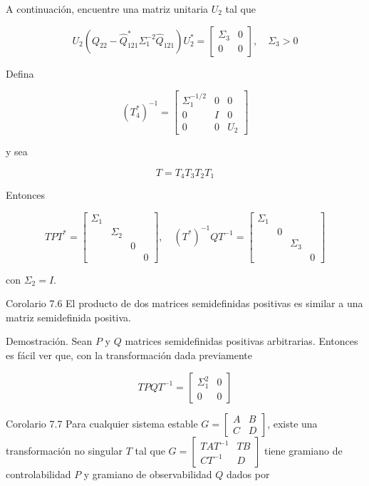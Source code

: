 A continuación, encuentre una matriz unitaria $U_{2}$ tal que

$$
U_{2}\left(Q_{22}-\hat{Q}_{121}^{*} \Sigma_{1}^{-2} \hat{Q}_{121}\right) U_{2}^{*}=\left[\begin{array}{cc}
\Sigma_{3} & 0 \\
0 & 0
\end{array}\right], \quad \Sigma_{3}>0
$$

Defina

$$
\left(T_{4}^{*}\right)^{-1}=\left[\begin{array}{ccc}
\Sigma_{1}^{-1 / 2} & 0 & 0 \\
0 & I & 0 \\
0 & 0 & U_{2}
\end{array}\right]
$$

y sea

$$
T=T_{4} T_{3} T_{2} T_{1}
$$

Entonces

$$
T P T^{*}=\left[\begin{array}{cccc}
\Sigma_{1} & & & \\
& \Sigma_{2} & & \\
& & 0 & \\
& & & 0
\end{array}\right], \quad\left(T^{*}\right)^{-1} Q T^{-1}=\left[\begin{array}{cccc}
\Sigma_{1} & & & \\
& 0 & & \\
& & \Sigma_{3} & \\
& & & 0
\end{array}\right]
$$

con $\Sigma_{2}=I$.

Corolario 7.6 El producto de dos matrices semidefinidas positivas es similar a una matriz semidefinida positiva.

Demostración. Sean $P$ y $Q$ matrices semidefinidas positivas arbitrarias. Entonces es fácil ver que, con la transformación dada previamente

$$
T P Q T^{-1}=\left[\begin{array}{cc}
\Sigma_{1}^{2} & 0 \\
0 & 0
\end{array}\right]
$$

Corolario 7.7 Para cualquier sistema estable $G=\left[\begin{array}{c|c}A & B \\ \hline C & D\end{array}\right]$, existe una transformación no singular $T$ tal que $G=\left[\begin{array}{c|c}T A T^{-1} & T B \\ \hline C T^{-1} & D\end{array}\right]$ tiene gramiano de controlabilidad $P$ y gramiano de observabilidad $Q$ dados por

